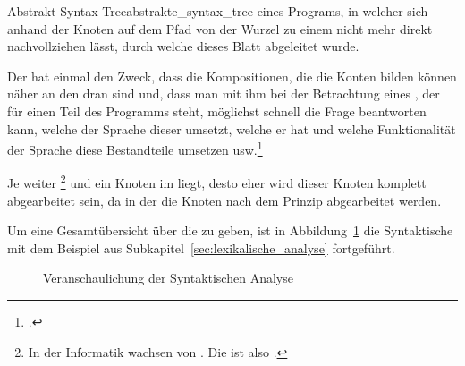 \begin{Definition}{Abstrakt Syntax Tree}{abstrakte_syntax_tree}
   eines Programs, in welcher sich anhand der Knoten auf dem Pfad von der Wurzel zu einem  nicht mehr direkt nachvollziehen lässt, durch welche  dieses Blatt abgeleitet wurde.

Der  hat einmal den Zweck, dass die Kompositionen, die die Konten bilden können  näher an den  dran sind und, dass man mit ihm bei der Betrachtung eines , der für einen Teil des Programms steht, möglichst schnell die Frage beantworten kann, welche  der Sprache dieser umsetzt, welche  er hat und welche Funktionalität der Sprache diese Bestandteile umsetzen usw.\footcite{noauthor_course_2022}
\end{Definition}

Je weiter \footnote{In der Informatik wachsen  von . Die  ist also .} und  ein Knoten im  liegt, desto eher wird dieser Knoten komplett abgearbeitet sein, da in der  die Knoten nach dem  Prinzip abgearbeitet werden.

Um eine Gesamtübersicht über die  zu geben, ist in Abbildung~\ref{fig:syntaktische_analyse_veranschaulichung} die Syntaktische mit dem Beispiel aus Subkapitel~\ref{sec:lexikalische_analyse} fortgeführt.

\pagebreak
\begin{figure}[H]
  \centering
  \hfill
  \vspace{2cm}

  \caption{Veranschaulichung der Syntaktischen Analyse}
  \label{fig:syntaktische_analyse_veranschaulichung}
\end{figure}

